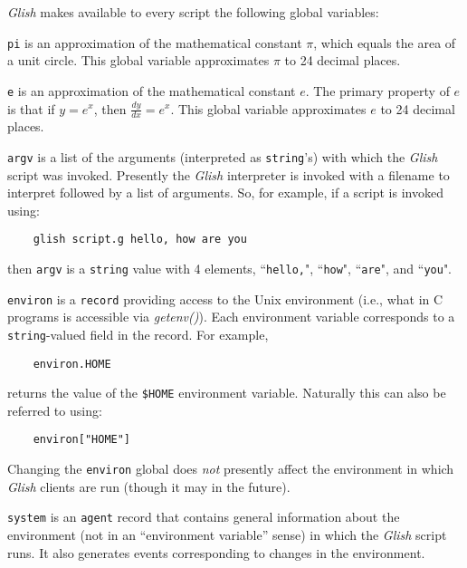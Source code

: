 {\em Glish} makes available to every script the following global variables:
\begin{sloppy}
\begin{list}{}{}

\item[{\tt pi}] \label{pi-var} 
is an approximation of the mathematical constant $\pi$, which equals
the area of a unit circle. This global variable approximates $\pi$ to
24 decimal places.

\item[{\tt e}] \label{e-var} 
is an approximation of the mathematical constant $e$. The primary property
of $e$ is that if \(y = e^x\), then \(\frac{dy}{dx} = e^x\). This global
variable approximates $e$ to 24 decimal places.

\item[{\tt argv}] \label{argv-var} 
is a list of the arguments (interpreted as {\tt string}'s)
with which the {\em Glish} script
was invoked.  Presently the {\em Glish} interpreter is invoked with a
filename to interpret followed by a list of arguments.
So, for example, if a script is invoked using:
\begin{verbatim}
    glish script.g hello, how are you
\end{verbatim}
then {\tt argv} is a {\tt string} value with 4 elements, ``{\tt hello,}",
``{\tt how}", ``{\tt are}", and ``{\tt you}".

\item[{\tt environ}] \label{environ-var} 
is a {\tt record} providing access to the {\sc Unix} environment
(i.e., what in C programs is accessible via
{\em getenv()}).  Each environment
variable corresponds to a {\tt string}-valued field in the record.
For example,
\begin{verbatim}
    environ.HOME
\end{verbatim}
returns the value of the {\tt \$HOME} environment variable.  Naturally
this can also be referred to using:
\begin{verbatim}
    environ["HOME"]
\end{verbatim}

Changing the {\tt environ} global does {\em not} presently affect the
environment in which {\em Glish} clients are run (though it may in the future).

\item[{\tt system}] \label{system-var} 
is an {\tt agent} record that contains general information about the
environment (not in an ``environment variable'' sense) in which the
{\em Glish} script runs.  It also generates events corresponding to changes
in the environment.


\end{list}
\end{sloppy}
